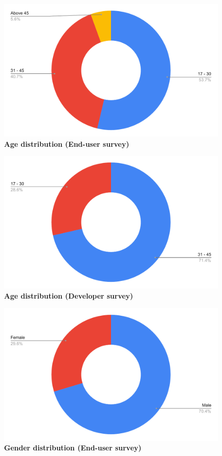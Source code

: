 \begin{figure}[H]
  \centering
  \includegraphics[width=13cm]{thesis/paper/images/p2u_age.pdf}
  \textbf{Age distribution (End-user survey)}
\end{figure}


\begin{figure}[H]
  \centering
  \includegraphics[width=13cm]{thesis/paper/images/p2d_age.pdf}
  \textbf{Age distribution (Developer survey)}
\end{figure}

\begin{figure}[H]
  \centering
  \includegraphics[width=13cm]{thesis/paper/images/p2u_gender.pdf}
  \textbf{Gender distribution (End-user survey)}
\end{figure}


